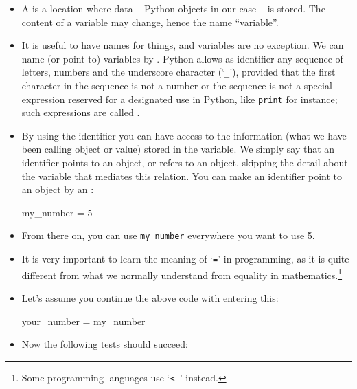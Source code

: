 \documentclass[a4paper]{article}
\begin{document}
\begin{itemize}

\item  A  is a location where data -- Python objects in our case
-- is stored. The content of a variable may change, hence the name ``variable''. 

\item It is useful to have names for things, and variables are no exception. We
can name (or point to) variables by . Python allows as
identifier any sequence of letters, numbers and the underscore character
(`\Verb+_+'), provided that the first character in the sequence is not a number
or the sequence is not a special expression reserved for a designated use in
Python, like \Verb+print+ for instance; such expressions are called
.  

\item By using the identifier you can have access to the information (what we
have been calling object or value) stored in the variable. We simply say that an
identifier points to an object, or refers to an object, skipping the detail
about the variable that mediates this relation.  You can make an identifier
point to an object by an :

\begin{ucodeframe}
\begin{pyconsole}
my_number = 5
\end{pyconsole}
\end{ucodeframe}

\item From there on, you can use \Verb+my_number+ everywhere you want to use 5.

\item It is very important to learn the meaning of `\Verb+=+' in programming, as
it is quite different from what we normally understand from equality in
mathematics.\footnote{Some programming languages use `\Verb+<-+' instead.}

\item Let's assume you continue the above code with entering this:  

\begin{ucodeframe}
\begin{pyconsole}
your_number = my_number 
\end{pyconsole}
\end{ucodeframe}

\item Now the following tests should succeed: 


\end{itemize}
\end{document}
